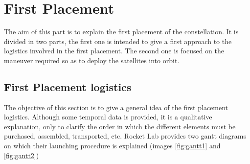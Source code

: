 
\section{First Placement}
The aim of this part is to explain the first placement of the constellation. It is divided in two parts, the first one is intended to give a first approach to the logistics involved in the first placement. The second one is focused on the maneuver required so as to deploy the satellites into orbit. 
\subsection{First Placement logistics}
The objective of this section is to give a general idea of the first placement logistics. Although some temporal data is provided, it is a qualitative explanation, only to clarify the order in which the different elements must be purchased, assembled, transported, etc. %
Rocket Lab provides two gantt diagrams on which their launching procedure is explained (images \ref{fig:gantt1} and \ref{fig:gantt2}) 
\newline
